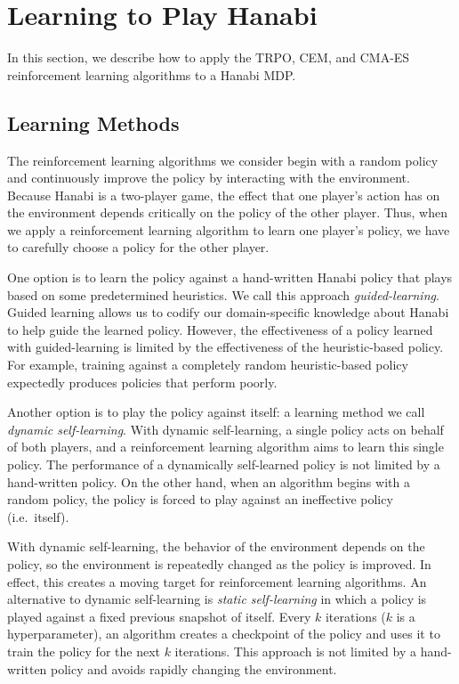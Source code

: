 \section{Learning to Play Hanabi}\label{sec:learninghanabi}

In this section, we describe how to apply the TRPO, CEM, and CMA-ES
reinforcement learning algorithms to a Hanabi MDP.

\subsection{Learning Methods}
The reinforcement learning algorithms we consider begin with a random policy
and continuously improve the policy by interacting with the environment.
Because Hanabi is a two-player game, the effect that one player's action has on
the environment depends critically on the policy of the other player. Thus,
when we apply a reinforcement learning algorithm to learn one player's policy,
we have to carefully choose a policy for the other player.

One option is to learn the policy against a hand-written Hanabi policy that
plays based on some predetermined heuristics. We call this approach
\emph{guided-learning}. Guided learning allows us to codify our domain-specific
knowledge about Hanabi to help guide the learned policy. However, the
effectiveness of a policy learned with guided-learning is limited by the
effectiveness of the heuristic-based policy. For example, training against a
completely random heuristic-based policy expectedly produces policies that
perform poorly.

Another option is to play the policy against itself: a learning method we call
\emph{dynamic self-learning}. With dynamic self-learning, a single policy acts
on behalf of both players, and a reinforcement learning algorithm aims to
learn this single policy. The performance of a dynamically self-learned
policy is not limited by a hand-written policy. On the other hand, when an
algorithm begins with a random policy, the policy is forced to play against an
ineffective policy (i.e.\ itself).

With dynamic self-learning, the behavior of the environment depends on the
policy, so the environment is repeatedly changed as the policy is improved. In
effect, this creates a moving target for reinforcement learning algorithms. An
alternative to dynamic self-learning is \emph{static self-learning} in which a
policy is played against a fixed previous snapshot of itself. Every $k$
iterations ($k$ is a hyperparameter), an algorithm creates a checkpoint of the
policy and uses it to train the policy for the next $k$ iterations. This
approach is not limited by a hand-written policy and avoids rapidly changing
the environment.

